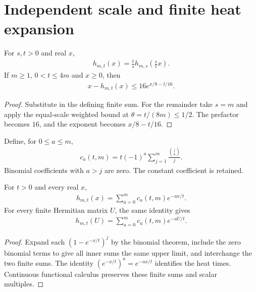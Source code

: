 \section{Independent scale and finite heat expansion}

\begin{lemma}
    \label{thm:soft_truncation_independent_scale}
    \leanok
    For $s,t>0$ and real $x$,
    \begin{align*}
        h_{m,t}(x)=\frac ts h_{m,s}\left(\frac stx\right).
    \end{align*}
    If $m\geq1$, $0<t\leq4m$ and $x\geq0$, then
    \begin{align*}
        x-h_{m,t}(x)\leq16e^{x/8-t/16}.
    \end{align*}
\end{lemma}
\begin{proof}\leanok
    Substitute in the defining finite sum. For the remainder take
    $s=m$ and apply the equal-scale weighted bound at
    $\theta=t/(8m)\leq1/2$. The prefactor becomes $16$, and the
    exponent becomes $x/8-t/16$.
\end{proof}

\begin{definition}
    \label{def:soft_truncation_heat_coefficients}
    \leanok
    Define, for $0\leq a\leq m$,
    \begin{align*}
        c_a(t,m)=t(-1)^a\sum_{j=1}^{m}\frac{\binom ja}{j}.
    \end{align*}
    Binomial coefficients with $a>j$ are zero. The constant
    coefficient is retained.
\end{definition}

\begin{lemma}
    \label{thm:soft_truncation_heat_expansion}
    \leanok
    For $t>0$ and every real $x$,
    \begin{align*}
        h_{m,t}(x)=\sum_{a=0}^m c_a(t,m)e^{-ax/t}.
    \end{align*}
    For every finite Hermitian matrix $U$, the same identity gives
    \begin{align*}
        h_{m,t}(U)=\sum_{a=0}^m c_a(t,m)e^{-aU/t}.
    \end{align*}
\end{lemma}
\begin{proof}\leanok
    Expand each $(1-e^{-x/t})^j$ by the binomial theorem, include
    the zero binomial terms to give all inner sums the same upper
    limit, and interchange the two finite sums. The identity
    $(e^{-x/t})^a=e^{-ax/t}$ identifies the heat times.
    Continuous functional calculus preserves these finite sums
    and scalar multiples.
\end{proof}

